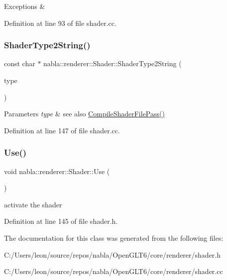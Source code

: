 \begin{DoxyExceptions}{Exceptions}
{\em } & \\
\hline
\end{DoxyExceptions}


Definition at line 93 of file shader.\+cc.

\mbox{\label{classnabla_1_1renderer_1_1_shader_ae8ea6d1d179f74f30e5298d7d994e462}} 
\subsubsection{\texorpdfstring{ShaderType2String()}{ShaderType2String()}}
{\footnotesize\ttfamily const char $\ast$ nabla\+::renderer\+::\+Shader\+::\+Shader\+Type2\+String (\begin{DoxyParamCaption}\item[{G\+Lenum}]{type }\end{DoxyParamCaption})\hspace{0.3cm}{\ttfamily [inline]}}


\begin{DoxyParams}{Parameters}
{\em type} & see also \mbox{\hyperlink{classnabla_1_1renderer_1_1_shader_a5d3c867efe766a1c0c38788fe5b42b7c}{Compile\+Shader\+File\+Pass()}} \\
\hline
\end{DoxyParams}


Definition at line 147 of file shader.\+cc.

\mbox{\label{classnabla_1_1renderer_1_1_shader_ab48b2ad73cbe3184e339f61e2aebeec9}} 
\subsubsection{\texorpdfstring{Use()}{Use()}}
{\footnotesize\ttfamily void nabla\+::renderer\+::\+Shader\+::\+Use (\begin{DoxyParamCaption}{ }\end{DoxyParamCaption})\hspace{0.3cm}{\ttfamily [inline]}}

activate the shader 

Definition at line 145 of file shader.\+h.



The documentation for this class was generated from the following files\+:\begin{DoxyCompactItemize}
\item 
C\+:/\+Users/leon/source/repos/nabla/\+Open\+G\+L\+T6/core/renderer/shader.\+h\item 
C\+:/\+Users/leon/source/repos/nabla/\+Open\+G\+L\+T6/core/renderer/shader.\+cc\end{DoxyCompactItemize}
